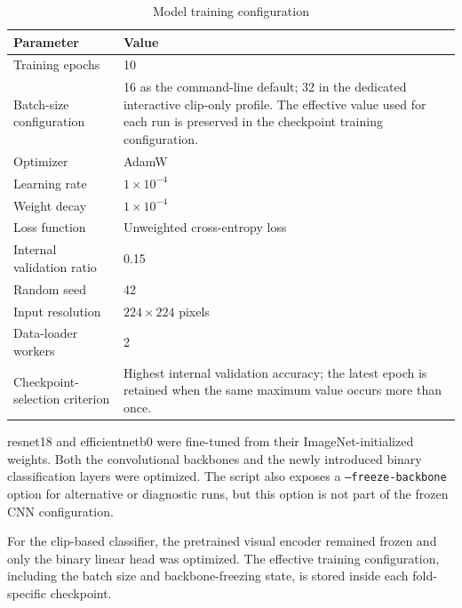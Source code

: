 \begin{table}[H]
\centering
\small
\renewcommand{\arraystretch}{1.15}
\setlength{\tabcolsep}{5pt}
\caption{Model training configuration}
\label{tab:implementation-proxy-training-configuration}
\begin{tabularx}{0.92\textwidth}{@{}l X@{}}
\toprule
\textbf{Parameter} &
\textbf{Value} \\
\midrule

Training epochs
&
10 \\

Batch-size configuration
&
16 as the command-line default; 32 in the dedicated interactive
\gls{clip}-only profile. The effective value used for each run is preserved in
the checkpoint training configuration. \\

Optimizer
&
AdamW \\

Learning rate
&
\(1 \times 10^{-4}\) \\

Weight decay
&
\(1 \times 10^{-4}\) \\

Loss function
&
Unweighted cross-entropy loss \\

Internal validation ratio
&
0.15 \\

Random seed
&
42 \\

Input resolution
&
\(224 \times 224\) pixels \\

Data-loader workers
&
2 \\

Checkpoint-selection criterion
&
Highest internal validation accuracy; the latest epoch is retained when the
same maximum value occurs more than once. \\

\bottomrule
\end{tabularx}
\end{table}

\gls{resnet18} and \gls{efficientnetb0} were fine-tuned from their ImageNet-initialized
weights. Both the convolutional backbones and the newly introduced binary
classification layers were optimized. The script also exposes a
\texttt{--freeze-backbone} option for alternative or diagnostic runs, but this
option is not part of the frozen CNN configuration.

For the \gls{clip}-based classifier, the pretrained visual encoder remained frozen
and only the binary linear head was optimized. The effective training
configuration, including the batch size and backbone-freezing state, is stored
inside each fold-specific checkpoint.

